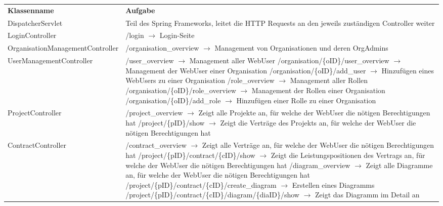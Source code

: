 \begin{table}[h]
	\centering
	\begin{tabularx}{\textwidth}{p{5.3cm} X}
		\rowcolor[HTML]{C0C0C0} 
		\textbf{Klassenname} & \textbf{Aufgabe} \\
		
		DispatcherServlet & Teil des Spring Frameworks, leitet die HTTP Requests an den jeweils zuständigen Controller weiter \\
		
		\rowcolor[HTML]{E7E7E7} 
		LoginController & /login $\rightarrow$ Login-Seite \\
		
		OrganisationManagementController & /organisation\_overview $\rightarrow$ Management von Organisationen und deren OrgAdmins \\
		
		\rowcolor[HTML]{E7E7E7} 
		UserManagementController & /user\_overview $\rightarrow$ Management aller WebUser \newline
		/organisation/\{oID\}/user\_overview $\rightarrow$ Management der WebUser einer Organisation \newline
		/organisation/\{oID\}/add\_user $\rightarrow$ Hinzufügen eines WebUsers zu einer Organisation \newline
		/role\_overview $\rightarrow$ Management aller Rollen \newline
		/organisation/\{oID\}/role\_overview $\rightarrow$ Management der Rollen einer Organisation \newline
		/organisation/\{oID\}/add\_role $\rightarrow$ Hinzufügen einer Rolle zu einer Organisation \\
		
		ProjectController & /project\_overview $\rightarrow$ Zeigt alle Projekte an, für welche der WebUser die nötigen Berechtigungen hat \newline
		/project/\{pID\}/show $\rightarrow$ Zeigt die Verträge des Projekts an, für welche der WebUser die nötigen Berechtigungen hat \\
		
		\rowcolor[HTML]{E7E7E7} 
		ContractController & /contract\_overview $\rightarrow$ Zeigt alle Verträge an, für welche der WebUser die nötigen Berechtigungen hat \newline
		/project/\{pID\}/contract/\{cID\}/show $\rightarrow$ Zeigt die Leistungspositionen des Vertrags an, für welche der WebUser die nötigen Berechtigungen hat \newline
		/diagram\_overview $\rightarrow$ Zeigt alle Diagramme an, für welche der WebUser die nötigen Berechtigungen hat \newline
		/project/\{pID\}/contract/\{cID\}/create\_diagram $\rightarrow$ Erstellen eines Diagramms \newline
		/project/\{pID\}/contract/\{cID\}/diagram/\{diaID\}/show $\rightarrow$ Zeigt das Diagramm im Detail an \\
		

\end{tabularx}
\end{table}
